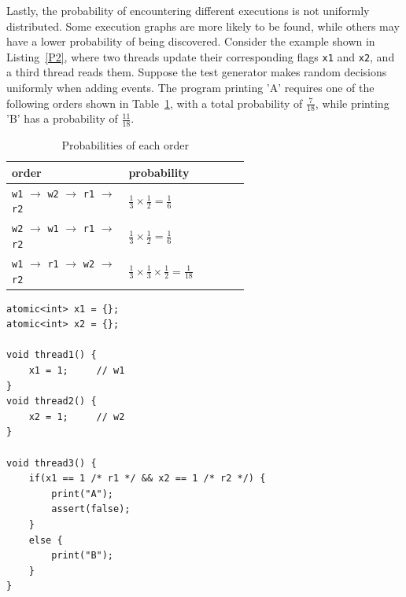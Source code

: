 Lastly, the probability of encountering different executions is not uniformly distributed. Some execution graphs are more likely to be found, while others may have a lower probability of being discovered. Consider the example shown in Listing~\ref{P2}, where two threads update their corresponding flags \texttt{x1} and \texttt{x2}, and a third thread reads them. Suppose the test generator makes random decisions uniformly when adding events. The program printing 'A' requires one of the following orders shown in Table~\ref{tab:order-prob}, with a total probability of $\frac{7}{18}$, while printing 'B' has a probability of $\frac{11}{18}$.



\begin{table}[h]
    \centering
    \renewcommand{\arraystretch}{1.5} %
    \begin{tabular}{|p{0.3\linewidth}|p{0.3\linewidth}|}    
        \hline
        order & probability  \\ \hline
        \texttt{w1} $\rightarrow$ \texttt{w2} $\rightarrow$ \texttt{r1} $\rightarrow$ \texttt{r2}  & $\frac{1}{3} \times \frac{1}{2} = \frac{1}{6}$ \\  
        \texttt{w2} $\rightarrow$ \texttt{w1} $\rightarrow$ \texttt{r1} $\rightarrow$ \texttt{r2} & $\frac{1}{3} \times \frac{1}{2} = \frac{1}{6}$ \\  
        \texttt{w1} $\rightarrow$ \texttt{r1} $\rightarrow$ \texttt{w2} $\rightarrow$ \texttt{r2} & $\frac{1}{3} \times \frac{1}{3} \times \frac{1}{2} = \frac{1}{18}$    \\ 
        \hline
    \end{tabular}
    \caption{Probabilities of each order}
    \label{tab:order-prob}
\end{table}

\begin{lstlisting}[caption={P2}, label={P2}]
atomic<int> x1 = {};
atomic<int> x2 = {};

void thread1() {
    x1 = 1;     // w1 
}
void thread2() {
    x2 = 1;     // w2
}

void thread3() {
    if(x1 == 1 /* r1 */ && x2 == 1 /* r2 */) {    
        print("A");
        assert(false);
    }
    else {
        print("B");        
    }
}
\end{lstlisting}



